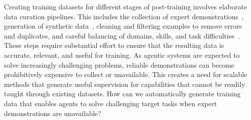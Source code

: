 Creating training datasets for different stages of post-training involves elaborate data curation pipelines. 
This includes the collection of expert demonstrations~\citep{li2025apple}, generation of synthetic data~\citep{bonito:aclfindings24}, cleaning and filtering examples to remove errors and duplicates, and careful balancing of domains, skills, and task difficulties~\citep{guha2026openthoughts}.
These steps require substantial effort to ensure that the resulting data is accurate, relevant, and useful for training. 
As agentic systems are expected to solve increasingly challenging problems, reliable demonstrations can become prohibitively expensive to collect or unavailable.
This creates a need for scalable methods that generate useful supervision for capabilities that cannot be readily taught through existing datasets.
How can we automatically generate training data that enables agents to solve challenging target tasks when expert demonstrations are unavailable?


